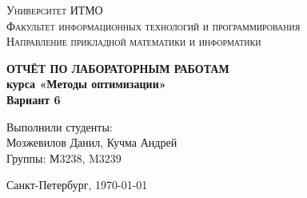 \documentclass[14pt,a4paper,report]{ncc}
\begin{document}
\renewcommand{\chaptername}{Лабораторная работа}
\def\contentsname{Содержание}

\begin{titlepage}
\begin{center}
\textsc{Университет ИТМО\\[5mm]
Факультет информационных технологий и программирования\\[2mm]
Направление прикладной математики и информатики}

\vfill

\textbf{ОТЧЁТ ПО ЛАБОРАТОРНЫМ РАБОТАМ\\[3mm]
курса «Методы оптимизации»\\[6mm]
Вариант 6
\\[20mm]
}
\end{center}

\hfill
\begin{minipage}{.45\textwidth}
Выполнили студенты:\\[2mm]
Мозжевилов Данил, Кучма Андрей\\
Группы: М3238, M3239\\[2mm]

\end{minipage}%
\vfill
\begin{center}
 Санкт-Петербург, \today
\end{center}
\end{titlepage}

\tableofcontents
\newpage



\begin{thebibliography}{9}

\end{thebibliography}
\end{document}
